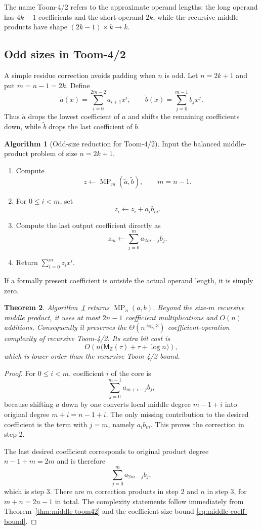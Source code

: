 \documentclass[11pt]{book}
\newtheorem{theorem}{Theorem}[section]
\theoremstyle{definition}
\newtheorem{algorithm}[theorem]{Algorithm}
\newcommand{\ZZ}{\mathbb Z}
\newcommand{\MZ}{\mathsf M_{\ZZ}}
\begin{document}
The name Toom-4/2 refers to the approximate operand lengths: the long operand
has $4k-1$ coefficients and the short operand $2k$, while the recursive middle
products have shape $(2k-1)\times k\to k$.

\subsection{Odd sizes in Toom-4/2}

A simple residue correction avoids padding when $n$ is odd.  Let
$n=2k+1$ and put $m=n-1=2k$.  Define
\[
 \widetilde a(x)=\sum_{i=0}^{2m-2}a_{i+1}x^i,
 \qquad
 \widetilde b(x)=\sum_{j=0}^{m-1}b_jx^j.
\]
Thus $\widetilde a$ drops the lowest coefficient of $a$ and shifts the
remaining coefficients down, while $\widetilde b$ drops the last coefficient
of $b$.

\begin{algorithm}[Odd-size reduction for Toom-4/2]\label{alg:middle-toom42-odd}
Input the balanced middle-product problem of size $n=2k+1$.
\begin{enumerate}
 \item Compute
 \[
    z\leftarrow\operatorname{MP}_{m}(\widetilde a,\widetilde b),
    \qquad m=n-1.
 \]
 \item For $0\leq i<m$, set
 \[
    z_i\leftarrow z_i+a_i b_m.
 \]
 \item Compute the last output coefficient directly as
 \[
    z_m\leftarrow\sum_{j=0}^{m}a_{2m-j}b_j.
 \]
 \item Return $\sum_{i=0}^{m}z_i x^i$.
\end{enumerate}
\end{algorithm}

If a formally present coefficient is outside the actual operand length, it is
simply zero.

\begin{theorem}\label{thm:middle-toom42-odd}
Algorithm~\ref{alg:middle-toom42-odd} returns
$\operatorname{MP}_n(a,b)$.  Beyond the size-$m$ recursive middle product, it
uses at most $2n-1$ coefficient multiplications and $O(n)$ additions.
Consequently it preserves the $\Theta(n^{\log_2 3})$ coefficient-operation
complexity of recursive Toom-4/2.  Its extra bit cost is
\[
 O\!\left(n\bigl(\MZ(\tau)+\tau+\log n\bigr)\right),
\]
which is lower order than the recursive Toom-4/2 bound.
\end{theorem}

\begin{proof}
For $0\leq i<m$, coefficient $i$ of the core is
\[
 \sum_{j=0}^{m-1}a_{m+i-j}b_j,
\]
because shifting $a$ down by one converts local middle degree $m-1+i$ into
original degree $m+i=n-1+i$.  The only missing contribution to the desired
coefficient is the term with $j=m$, namely $a_i b_m$.  This proves the
correction in step 2.

The last desired coefficient corresponds to original product degree
$n-1+m=2m$ and is therefore
\[
 \sum_{j=0}^{m}a_{2m-j}b_j,
\]
which is step 3.  There are $m$ correction products in step 2 and $n$ in step
3, for $m+n=2n-1$ in total.  The complexity statements follow immediately
from Theorem~\ref{thm:middle-toom42} and the coefficient-size bound
\eqref{eq:middle-coeff-bound}.
\end{proof}
\end{document}
